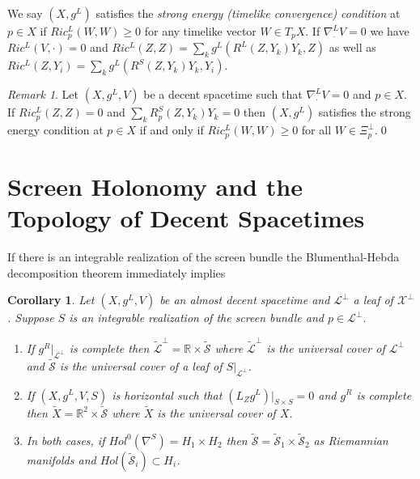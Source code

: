 \documentclass[a4paper,10pt,twoside]{amsart}
\newtheorem{corollary}[theorem]{Corollary}
\theoremstyle{definition}
\theoremstyle{remark}
\newtheorem{remark}[theorem]{Remark}
\numberwithin{equation}{section}
\begin{document}
We say $(X,g^{L})$ satisfies the {\em strong energy (timelike convergence) condition} at $p \in X$ if $Ric^{L}_{p}(W,W) \geq 0$ for any timelike vector
$W \in T_{p}X$. If $\nabla^{L}_{\cdot}{V}=0$ we have $Ric^{L}(V,\cdot)=0$ and $Ric^{L}(Z,Z) = \sum_{k}{g^{L}(R^{L}(Z,Y_{k})Y_{k},Z)}$ as well as
$Ric^{L}(Z,Y_{i}) = \sum_{k}{g^{L}(R^{S}(Z,Y_{k})Y_{k},Y_{i})}$.
\begin{remark}
	Let $(X,g^{L},V)$ be a decent spacetime such that $\nabla^{L}_{\cdot}{V}=0$ and $p \in X$. If $Ric^{L}_{p}(Z,Z)=0$ and
	$\sum_{k}{R^{S}_{p}(Z,Y_{k})Y_{k}}=0$ then $(X,g^{L})$ satisfies the strong energy condition at $p \in X$ if and only if
	$Ric^{L}_{p}(W,W) \geq 0$ for all $W \in \Xi^{\perp}_{p}$.\qed
\end{remark}
\section{Screen Holonomy and the Topology of Decent Spacetimes}
If there is an integrable realization of the screen bundle the Blumenthal-Hebda decomposition theorem \cite{MR699494} immediately implies
\begin{corollary}
	Let $(X,g^{L},V)$ be an almost decent spacetime and $\mathcal{L}^{\perp}$ a leaf of $\mathcal{X}^{\perp}$. Suppose $S$ is an integrable
	realization of the screen bundle and $p \in \mathcal{L}^{\perp}$.
	\begin{enumerate}
		\item
		If $g^{R}|_{\mathcal{L}^{\perp}}$ is complete then $\tilde{\mathcal{L}}^{\perp}= {\mathbb{R}} \times \tilde{\mathcal{S}}$ where
		$\tilde{\mathcal{L}}^{\perp}$ is the universal cover of $\mathcal{L}^{\perp}$ and $\tilde{\mathcal{S}}$ is the universal cover of a
		leaf of $S|_{\mathcal{L}^{\perp}}$.
		\item
		If $(X,g^{L},V,S)$ is horizontal such that $(L_{Z}g^{L})|_{S \times S}=0$ and $g^{R}$ is complete then
		$\tilde{X} = {\mathbb{R}}^{2} \times \tilde{\mathcal{S}}$ where $\tilde{X}$ is the universal cover of $X$.
		\item
		In both cases, if $Hol^{0}(\nabla^{S}) = H_{1} \times H_{2}$ then
		$\tilde{\mathcal{S}}=\tilde{\mathcal{S}}_{1} \times \tilde{\mathcal{S}}_{2}$ as Riemannian manifolds and
		$Hol(\tilde{\mathcal{S}}_{i}) \subset H_{i}$.
	\end{enumerate}
\end{corollary}
\end{document}
